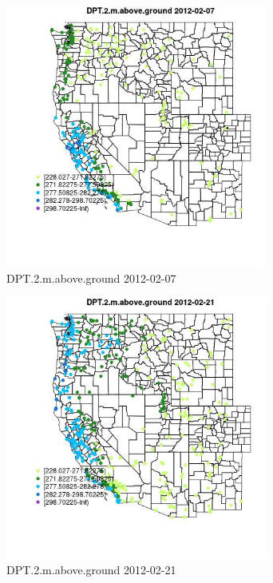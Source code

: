 \begin{figure} 
\centering  
\includegraphics[width=0.77\textwidth]{Code_Outputs/Report_ML_input_PM25_Step4_part_f_de_duplicated_aveswNAs_MapObsDPT2maboveground2012-02-07.jpg} 
\caption{\label{fig:Report_ML_input_PM25_Step4_part_f_de_duplicated_aveswNAsMapObsDPT2maboveground2012-02-07}DPT.2.m.above.ground 2012-02-07} 
\end{figure} 
 

\clearpage 

\begin{figure} 
\centering  
\includegraphics[width=0.77\textwidth]{Code_Outputs/Report_ML_input_PM25_Step4_part_f_de_duplicated_aveswNAs_MapObsDPT2maboveground2012-02-21.jpg} 
\caption{\label{fig:Report_ML_input_PM25_Step4_part_f_de_duplicated_aveswNAsMapObsDPT2maboveground2012-02-21}DPT.2.m.above.ground 2012-02-21} 
\end{figure} 
 

